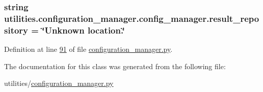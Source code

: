 \subsubsection[{result\+\_\+repository}]{\setlength{\rightskip}{0pt plus 5cm}string utilities.\+configuration\+\_\+manager.\+config\+\_\+manager.\+result\+\_\+repository = \char`\"{}Unknown location.\char`\"{}\hspace{0.3cm}{\ttfamily [static]}}\label{classutilities_1_1configuration__manager_1_1config__manager_a19ed9ae453acea0ed85f704f18ee4b30}


Definition at line \hyperlink{configuration__manager_8py_source_l00091}{91} of file \hyperlink{configuration__manager_8py_source}{configuration\+\_\+manager.\+py}.



The documentation for this class was generated from the following file\+:\begin{DoxyCompactItemize}
\item 
utilities/\hyperlink{configuration__manager_8py}{configuration\+\_\+manager.\+py}\end{DoxyCompactItemize}
